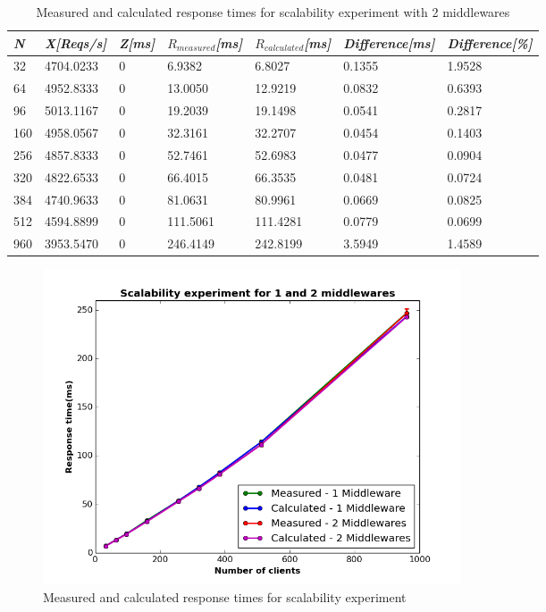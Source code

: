 \documentclass[11pt]{article}
\begin{document}
\begin{table}[!ht]
  \begin{tabular}{*7l}    \toprule
   \emph{N} & \emph{X[Reqs/s]} & \emph{Z[ms]} & \emph{$R_{measured}$[ms]} & \emph{$R_{calculated}$[ms]} &   \emph{Difference[ms]} & \emph{Difference[\%]} \\\midrule
32 & 4704.0233 & 0 & 6.9382  &  6.8027 & 0.1355     & 1.9528 \\
64 & 4952.8333 & 0 & 13.0050 & 12.9219 & 0.0832     & 0.6393 \\
96 & 5013.1167 & 0 & 19.2039 & 19.1498 & 0.0541     & 0.2817 \\
160& 4958.0567 & 0  & 32.3161 & 32.2707& 0.0454     & 0.1403\\
256 & 4857.8333 & 0 & 52.7461 & 52.6983 & 0.0477    & 0.0904\\
320 & 4822.6533 & 0  & 66.4015 & 66.3535& 0.0481    & 0.0724 \\
384 & 4740.9633 & 0 & 81.0631& 80.9961 & 0.0669     & 0.0825\\
512 & 4594.8899 & 0 & 111.5061 & 111.4281 & 0.0779  & 0.0699\\
960 & 3953.5470  & 0 & 246.4149 & 242.8199 & 3.5949 & 1.4589\\
    \hline
  \end{tabular}
  \centering
  \caption{Measured and calculated response times for scalability experiment with 2 middlewares}
  \label{tbl:scalability-2middlewares}
\end{table} 

\begin{figure}[H]
  \includegraphics[width=0.6\textwidth,page=1]{figures/interactive_law/scalability}
  \centering
  \caption{Measured and calculated response times for scalability experiment}
  \label{fig:interactive-scalability}
\end{figure}
\end{document}
